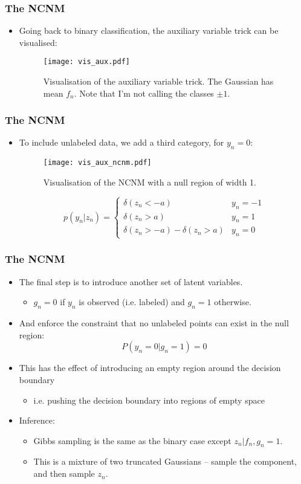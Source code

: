 \begin{frame}
	\frametitle{The \ac{NCNM}}
	\begin{itemize}
		\item Going back to binary classification, the auxiliary variable trick can be visualised:
		\begin{figure}[tbh]
			\centering\texttt{[image: vis\_aux.pdf]}
			\centering\caption{\label{fig:vis_aux}Visualisation of the auxiliary variable trick. The Gaussian has mean $f_n$. Note that I'm not calling the classes $\pm 1$.}
		\end{figure}
	\end{itemize}
\end{frame}

\begin{frame}
	\frametitle{The \ac{NCNM}}
	\begin{itemize}
		\item To include unlabeled data, we add a third category, for $y_n=0$:
		\begin{figure}[tbh]
			\centering\texttt{[image: vis\_aux\_ncnm.pdf]}
			\centering\caption{\label{fig:vis_aux_ncnm}Visualisation of the \ac{NCNM} with a null region of width 1.}
		\end{figure}
		\[
			p(y_n|z_n) = \left\{ 
				\begin{array}{ll}
					\delta(z_n<-a) & y_n = -1\\
					\delta(z_n>a) & y_n = 1\\
					\delta(z_n>-a) - \delta(z_n>a) & y_n=0
				\end{array}
			\right.
		\]
	\end{itemize}
\end{frame}

\begin{frame}
	\frametitle{The \ac{NCNM}}
	\begin{itemize}
		\item The final step is to introduce another set of latent variables.
		\begin{itemize}
			\item $g_n=0$ if $y_n$ is observed (i.e. labeled) and $g_n=1$ otherwise.
		\end{itemize}
		\item And enforce the constraint that no unlabeled points can exist in the null region:
		\[
			P(y_n=0|g_n=1) = 0
		\]
		\item<2->This has the effect of introducing an empty region around the decision boundary
		\begin{itemize}
			\item i.e. pushing the decision boundary into regions of empty space
		\end{itemize}
		\item<3->Inference:
		\begin{itemize}
			\item Gibbs sampling is the same as the binary case except $z_n|f_n,g_n=1$.
			\item This is a mixture of two truncated Gaussians -- sample the component, and then sample $z_n$.
		\end{itemize}
	\end{itemize}
\end{frame}

